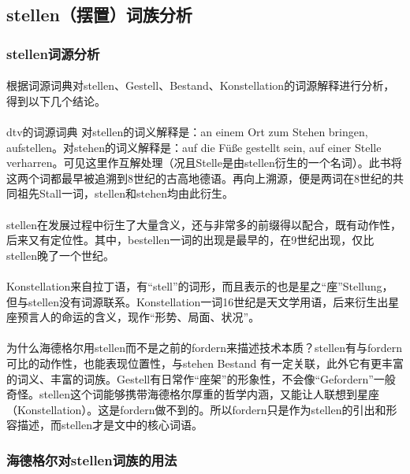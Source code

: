 \documentclass{article}
\begin{document}
	\subsection{stellen（摆置）词族分析} 
		\subsubsection{stellen词源分析}
			\paragraph{}
		根据词源词典对stellen、Gestell、Bestand、Konstellation的词源解释进行分析，得到以下几个结论。
			\paragraph{}
		dtv的词源词典
		\cite{yellow_etym}对stellen的词义解释是：an einem Ort zum Stehen bringen, aufstellen。对stehen的词义解释是：auf die Füße gestellt sein, auf einer Stelle verharren。可见这里作互解处理（况且Stelle是由stellen衍生的一个名词）。此书将这两个词都最早被追溯到8世纪的古高地德语。再向上溯源，便是两词在8世纪的共同祖先Stall一词，stellen和stehen均由此衍生。
			\paragraph{}
		stellen在发展过程中衍生了大量含义，还与非常多的前缀得以配合，既有动作性，后来又有定位性。其中，bestellen一词的出现是最早的，在9世纪出现，仅比stellen晚了一个世纪。
			\paragraph{}
		Konstellation来自拉丁语，有“stell”的词形，而且表示的也是星之“座”Stellung，但与stellen没有词源联系。Konstellation一词16世纪是天文学用语，后来衍生出星座预言人的命运的含义，现作“形势、局面、状况”。
			\paragraph{}
		为什么海德格尔用stellen而不是之前的fordern来描述技术本质？stellen有与fordern可比的动作性，也能表现位置性，与stehen Bestand 有一定关联，此外它有更丰富的词义、丰富的词族。Gestell有日常作“座架”的形象性，不会像“Gefordern”一般奇怪。stellen这个词能够携带海德格尔厚重的哲学内涵，又能让人联想到星座（Konstellation）。这是fordern做不到的。所以fordern只是作为stellen的引出和形容描述，而stellen才是文中的核心词语。
		\subsubsection{海德格尔对stellen词族的用法}
\end{document}
